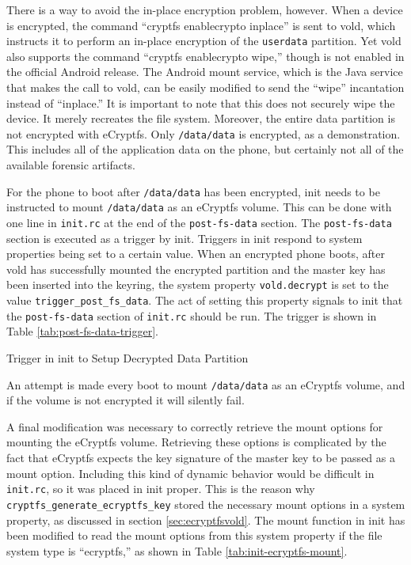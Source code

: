 There is a way to avoid the in-place encryption problem, however. When a device is encrypted, the command ``cryptfs enablecrypto
inplace'' is sent to vold, which instructs it to perform an in-place encryption of the \texttt{userdata} partition. Yet vold also
supports the command ``cryptfs enablecrypto wipe,'' though is not enabled in the official Android release. The Android mount
service, which is the Java service that makes the call to vold, can be easily modified to send the ``wipe'' incantation instead of
``inplace.'' It is important to note that this does not securely wipe the device. It merely recreates the file system.  Moreover,
the entire data partition is not encrypted with eCryptfs. Only \texttt{/data/data} is encrypted, as a demonstration. This includes
all of the application data on the phone, but certainly not all of the available forensic artifacts.

For the phone to boot after \texttt{/data/data} has been encrypted, init needs to be instructed to mount \texttt{/data/data} as an
eCryptfs volume. This can be done with one line in \texttt{init.rc} at the end of the \texttt{post-fs-data} section. The
\texttt{post-fs-data} section is executed as a trigger by init. Triggers in init respond to system properties being set to a certain
value. When an encrypted phone boots, after vold has successfully mounted the encrypted partition and the master key has been
inserted into the keyring, the system property \texttt{vold.decrypt} is set to the value \texttt{trigger\_post\_fs\_data}. The act
of setting this property signals to init that the \texttt{post-fs-data} section of \texttt{init.rc} should be run. The trigger is
shown in Table \ref{tab:post-fs-data-trigger}.  
\begin{table}[!htb] 
 
\caption{Trigger in init to Setup Decrypted Data Partition}
\label{tab:post-fs-data-trigger} 
\end{table} 
An attempt is made every boot to mount
\texttt{/data/data} as an eCryptfs volume, and if the volume is not encrypted it will silently fail. 

A final modification was necessary to correctly retrieve the mount options for mounting the eCryptfs volume. Retrieving these
options is complicated by the fact that eCryptfs expects the key signature of the master key to be passed as a mount option.
Including this kind of dynamic behavior would be difficult in \texttt{init.rc}, so it was placed in init proper. This is
the reason why \texttt{cryptfs\_generate\_ecryptfs\_key} stored the necessary mount options in a system property, as discussed in
section \ref{sec:ecryptfsvold}. The mount function in init has been modified to read the mount options from this system
property if the file system type is ``ecryptfs,'' as shown in Table \ref{tab:init-ecryptfs-mount}.

